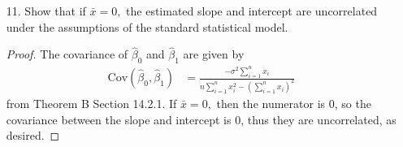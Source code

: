 \documentclass{article}
\newcommand{\cov}{\mathrm{Cov}}
\begin{document}
\begin{itemize}
\begin{proof}
			Next, taking the derivative with respect to $\hat\beta_1,$ we have
			\begin{align*}
				-2\sum_{i=1}^{n}x_i(y_i-\hat\beta_0-\hat\beta_1 x_i) &= -2\left( \sum_{i=1}^{n} x_iy_i - \hat\beta_0 \sum_{i=1}^{n} x_i - \hat\beta_1\sum_{i=1}^{n} x_i^2 \right) = 0 \\
				\implies \sum_{i=1}^{n} x_iy_i - (\bar y - \hat\beta_1\bar x)\sum_{i=1}^{n} x_i - \hat\beta_1 \sum_{i=1}^{n}x_i^2 &= 0 \\
				\implies \sum_{i=1}^{n} x_iy_i - n\bar x\bar y + n\hat\beta_1\bar x^2 - \hat\beta_1 \sum_{i=1}^{n} x_i^2 &= 0 \\
				\implies \hat\beta_1 \left(\sum_{i=1}^{n} x_i^2 -n\bar x^2\right) &= \sum_{i=1}^{n} x_iy_i-n\bar x\bar y
			\end{align*}
			We have
			\begin{align*}
				\sum_{i=1}^{n} (x_i-\bar x)^2 &= \sum_{i=1}^{n} x_i^2 - \bar x\sum_{i=1}^{n} x_i + n\bar x^2 \\
				&= \sum_{i=1}^{n} x_i^2 - n\bar x^2 \\
				\sum_{i=1}^{n} (x_i-\bar x)(y_i-\bar y) &= \sum_{i=1}^{n} x_iy_i - \bar x\sum_{i=1}^{n} y_i - \bar y\sum_{i=1}^{n} x_i + n\bar x\bar y \\
				&= \sum_{i=1}^{n} x_iy_i - n\bar x\bar y - n\bar x\bar y + n\bar x\bar y = \sum_{i=1}^{n} x_iy_i - n\bar x\bar y
			\end{align*}
			Thus, solving for $\hat\beta_1,$ we have 
			\[\hat\beta_1 = \frac{\displaystyle\sum_{i=1}^{n} x_iy_i-n\bar x\bar y}{\displaystyle\sum_{i=1}^{n} x_i^2 - n\bar x^2} = \frac{\displaystyle\sum_{i=1}^{n} (x_i-\bar x)(y_i-\bar y)}{\displaystyle\sum_{i=1}^{n} (x_i-\bar x)^2}\]
			as desired.
		\end{proof}

	\item[11.] Show that if $\bar x=0,$ the estimated slope and intercept are uncorrelated under the assumptions of the standard statistical model.
		\begin{proof}
			The covariance of $\hat\beta_0$ and $\hat\beta_1$ are given by
			\begin{align*}
				\cov(\hat\beta_0, \hat\beta_1) &= \frac{-\displaystyle\sigma^2\sum_{i=1}^{n} x_i}{\displaystyle n\sum_{i=1}^{n} x_i^2-\left( \sum_{i=1}^{n} x_i \right)^2}
			\end{align*}
			from Theorem B Section 14.2.1. If $\bar x=0,$ then the numerator is 0, so the covariance between the slope and intercept is 0, thus they are uncorrelated, as desired.	
		\end{proof}


\end{itemize}
\end{document}
